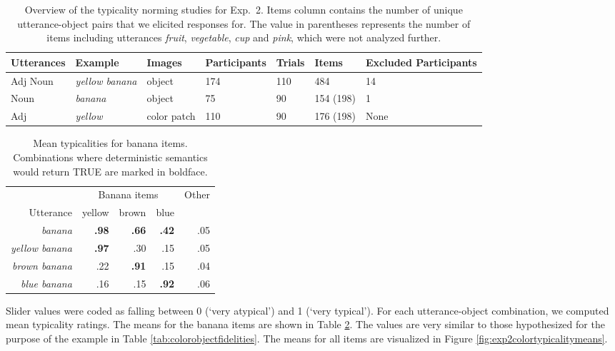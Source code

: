 \documentclass[11pt]{article}
\newcommand{\tableref}[1]{Table \ref{#1}}
\newcommand{\figref}[1]{Figure \ref{#1}}
\begin{document}
\begin{table}[bt!]
	\begin{tabular}{l l l l l l l}
		\toprule
		Utterances & Example & Images & Participants & Trials & Items & Excluded Participants\\
		\midrule
		Adj Noun & \emph{yellow banana} & object & 174 & 110 & 484 & 14\\ 
		Noun & \emph{banana} & object & 75 & 90 & 154 (198) & 1\\
		Adj & \emph{yellow} & color patch & 110 & 90 & 176 (198) & None\\
		\bottomrule
	\end{tabular}
	\vspace{2mm}
	\caption{Overview of the typicality norming studies for Exp.~2. Items column contains the number of unique utterance-object pairs that we elicited responses for. The value in parentheses represents the number of items including utterances \textit{fruit}, \textit{vegetable}, \textit{cup} and \textit{pink}, which were not analyzed further.}
	\label{tab:normingoverview}
\end{table}

\begin{table}[bt!]
	\caption{Mean typicalities for banana items. Combinations where deterministic semantics would return TRUE are marked in boldface.}
\centering
	\begin{tabular}{r r r r r}
		\toprule
		& \multicolumn{3}{c}{Banana items} & Other \\
		Utterance & yellow & brown  & blue & \\ 
		\midrule
		\emph{banana} & \textbf{.98} & \textbf{.66} & \textbf{.42} & .05  \\
		\midrule
		\emph{yellow banana} & \textbf{.97} & .30 & .15 & .05 \\
		\emph{brown banana} & .22 & \textbf{.91} & .15 & .04\\
		\emph{blue banana} & .16 & .15 & \textbf{.92} & .06\\
		\bottomrule
	\end{tabular}
	\vspace{5mm}
	\label{tab:bananatypicalities}
\end{table}

Slider values were coded as falling between 0 (`very atypical') and 1 (`very typical'). 
For each utterance-object combination, we computed mean typicality ratings. The means for the banana items are shown in \tableref{tab:bananatypicalities}. The values are very similar to those hypothesized for the purpose of the example in \tableref{tab:colorobjectfidelities}. The means for all items are visualized in \figref{fig:exp2colortypicalitymeans}.
\end{document}

